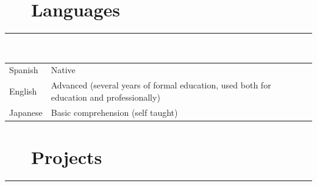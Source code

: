 \documentclass{article}
\newcommand{\shade}[1]{\textcolor{myGray}{#1}}
\begin{document}
\section*{\faLanguage ~~ Languages}
\hrule

\
\newline
\

\begin{longtable}{l | l}
    Spanish & Native \\
    English & Advanced \shade{(several years of formal education, used both for education and professionally)}\\
    Japanese & Basic comprehension \shade{(self taught)}
\end{longtable}

\section*{\faFileCodeO ~~ Projects}
\hrule
\
\end{document}
